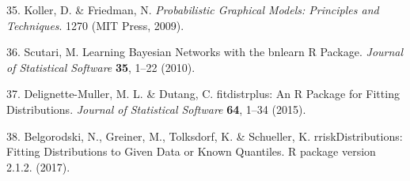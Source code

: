 \documentclass[12pt,oneside]{article}
\begin{document}
\leavevmode\hypertarget{ref-Koller_and_Friedman_2009}{}%
35. Koller, D. \& Friedman, N. \emph{Probabilistic Graphical Models: Principles and Techniques}. 1270 (MIT Press, 2009).

\leavevmode\hypertarget{ref-Scutari_2010}{}%
36. Scutari, M. Learning Bayesian Networks with the bnlearn R Package. \emph{Journal of Statistical Software} \textbf{35}, 1--22 (2010).

\leavevmode\hypertarget{ref-Delignette-Muller_and_Dutang_2015}{}%
37. Delignette-Muller, M. L. \& Dutang, C. fitdistrplus: An R Package for Fitting Distributions. \emph{Journal of Statistical Software} \textbf{64}, 1--34 (2015).

\leavevmode\hypertarget{ref-Belgorodski_et_al_2017}{}%
38. Belgorodski, N., Greiner, M., Tolksdorf, K. \& Schueller, K. rriskDistributions: Fitting Distributions to Given Data or Known Quantiles. R package version 2.1.2. (2017).
\end{document}
